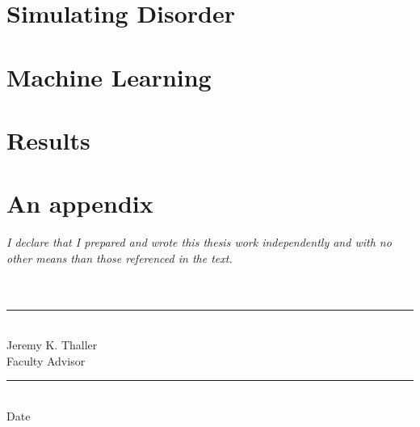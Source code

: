 \documentclass[12pt, oneside]{book}
\begin{document}
\chapter{Simulating Disorder}


\chapter{Machine Learning}


\chapter{Results}



\appendix 


\chapter{An appendix}









\pagebreak
% 
\textit{I declare that I prepared and wrote this thesis work independently and with no other means
than those referenced in the text.}
\\
\\
\\
\parbox{2in}{\rule{2in}{0.4pt}\\ Jeremy K. Thaller\\Faculty Advisor}\hfill\parbox{2in}{\rule{1in}{0.4pt}\\ Date\\\mbox{}}
\end{document}
